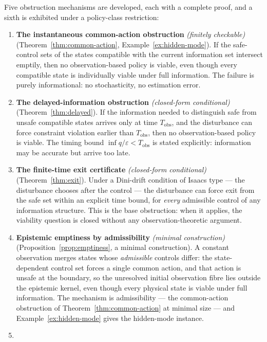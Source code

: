 \documentclass[10pt,twocolumn]{article}
\theoremstyle{definition}
\begin{document}
Five obstruction mechanisms are developed, each with a complete proof,
and a sixth is exhibited under a policy-class restriction:

\begin{enumerate}
\def\labelenumi{\arabic{enumi}.}
\item
  \textbf{The instantaneous common-action obstruction} \emph{(finitely checkable)} (Theorem~\ref{thm:common-action},
  Example~\ref{ex:hidden-mode}). If the safe-control sets of the states compatible with the
  current information set intersect emptily, then no observation-based
  policy is viable, even though every compatible state is individually
  viable under full information. The failure is purely informational: no
  stochasticity, no estimation error.
\item
  \textbf{The delayed-information obstruction} \emph{(closed-form conditional)} (Theorem~\ref{thm:delayed}). If the
  information needed to distinguish safe from unsafe compatible states
  arrives only at time \(T_{\mathrm{obs}}\), and the disturbance can
  force constraint violation earlier than \(T_{\mathrm{obs}}\), then no
  observation-based policy is viable. The timing bound
  \(\inf q / \varepsilon < T_{\mathrm{obs}}\) is stated explicitly:
  information may be accurate but arrive too late.
\item
  \textbf{The finite-time exit certificate} \emph{(closed-form conditional)} (Theorem~\ref{thm:exit}). Under a
  Dini-drift condition of Isaacs type --- the disturbance chooses after
  the control --- the disturbance can force exit from the safe set
  within an explicit time bound, for \emph{every} admissible control of
  any information structure. This is the base obstruction: when it
  applies, the viability question is closed without any
  observation-theoretic argument.
\item
  \textbf{Epistemic emptiness by admissibility} \emph{(minimal construction)} (Proposition~\ref{prop:emptiness}, a minimal
  construction). A constant observation merges states whose
  \emph{admissible} controls differ: the state-dependent control set
  forces a single common action, and that action is unsafe at the
  boundary, so the unresolved initial observation fibre lies outside the
  epistemic kernel, even though every physical state is viable under
  full information. The mechanism is admissibility --- the common-action
  obstruction of Theorem~\ref{thm:common-action} at minimal size --- and Example~\ref{ex:hidden-mode} gives the hidden-mode instance.
\item

\end{enumerate}
\end{document}
